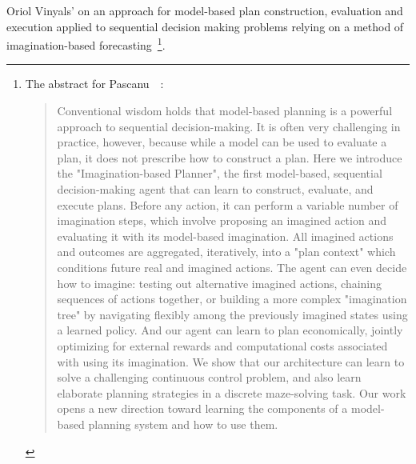 Oriol Vinyals' {} on an approach for model-based plan construction, evaluation and execution applied to sequential decision making problems relying on a method of imagination-based forecasting~\cite{PascanuetalCoRR-17}\footnote{%
%
  The abstract for Pascanu~\etal{}~\cite{PascanuetalCoRR-17}:
%
  \begin{quotation}
%
   Conventional wisdom holds that model-based planning is a powerful approach to sequential decision-making. It is often very challenging in practice, however, because while a model can be used to evaluate a plan, it does not prescribe how to construct a plan. Here we introduce the "Imagination-based Planner", the first model-based, sequential decision-making agent that can learn to construct, evaluate, and execute plans. Before any action, it can perform a variable number of imagination steps, which involve proposing an imagined action and evaluating it with its model-based imagination. All imagined actions and outcomes are aggregated, iteratively, into a "plan context" which conditions future real and imagined actions. The agent can even decide how to imagine: testing out alternative imagined actions, chaining sequences of actions together, or building a more complex "imagination tree" by navigating flexibly among the previously imagined states using a learned policy. And our agent can learn to plan economically, jointly optimizing for external rewards and computational costs associated with using its imagination. We show that our architecture can learn to solve a challenging continuous control problem, and also learn elaborate planning strategies in a discrete maze-solving task. Our work opens a new direction toward learning the components of a model-based planning system and how to use them.  
%
  \end{quotation}}.

